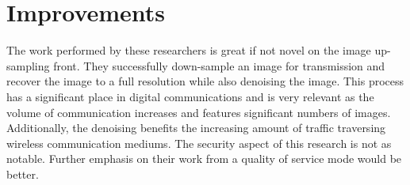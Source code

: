 \documentclass[]{article}
\begin{document}
\section{Improvements}

The work performed by these researchers is great if not novel on the image up-sampling front. 
They successfully down-sample an image for transmission and recover the image to a full resolution while also denoising the image.
This process has a significant place in digital communications and is very relevant as the volume of communication increases and features significant numbers of images.
Additionally, the denoising benefits the increasing amount of traffic traversing wireless communication mediums.
The security aspect of this research is not as notable. 
Further emphasis on their work from a quality of service mode would be better.


\clearpage


\end{document}
